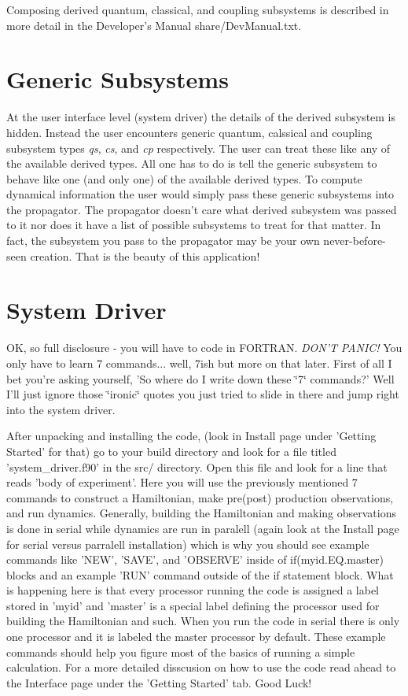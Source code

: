 Composing derived quantum, classical, and coupling subsystems is described in more detail in the Developer's Manual share/\+Dev\+Manual.\+txt.\hypertarget{_overview_Generic_Subsystems}{}\section{Generic Subsystems}\label{_overview_Generic_Subsystems}
At the user interface level (system driver) the details of the derived subsystem is hidden. Instead the user encounters generic quantum, calssical and coupling subsystem types {\itshape qs}, {\itshape cs}, and {\itshape cp} respectively. The user can treat these like any of the available derived types. All one has to do is tell the generic subsystem to behave like one (and only one) of the available derived types. To compute dynamical information the user would simply pass these generic subsystems into the propagator. The propagator doesn't care what derived subsystem was passed to it nor does it have a list of possible subsystems to treat for that matter. In fact, the subsystem you pass to the propagator may be your own never-\/before-\/seen creation. That is the beauty of this application!\hypertarget{_overview_System_Driver}{}\section{System Driver}\label{_overview_System_Driver}
O\+K, so full disclosure -\/ you will have to code in F\+O\+R\+T\+R\+A\+N. {\itshape D\+O\+N'T} {\itshape P\+A\+N\+I\+C!} You only have to learn 7 commands... well, 7ish but more on that later. First of all I bet you're asking yourself, 'So where do I write down these \char`\"{}7\char`\"{} commands?' Well I'll just ignore those \char`\"{}ironic\char`\"{} quotes you just tried to slide in there and jump right into the system driver.

After unpacking and installing the code, (look in Install page under 'Getting Started' for that) go to your build directory and look for a file titled 'system\+\_\+driver.\+f90' in the src/ directory. Open this file and look for a line that reads 'body of experiment'. Here you will use the previously mentioned 7 commands to construct a Hamiltonian, make pre(post) production observations, and run dynamics. Generally, building the Hamiltonian and making observations is done in serial while dynamics are run in paralell (again look at the Install page for serial versus parralell installation) which is why you should see example commands like 'N\+E\+W', 'S\+A\+V\+E', and 'O\+B\+S\+E\+R\+V\+E' inside of if(myid.\+E\+Q.\+master) blocks and an example 'R\+U\+N' command outside of the if statement block. What is happening here is that every processor running the code is assigned a label stored in 'myid' and 'master' is a special label defining the processor used for building the Hamiltonian and such. When you run the code in serial there is only one processor and it is labeled the master processor by default. These example commands should help you figure most of the basics of running a simple calculation. For a more detailed disscusion on how to use the code read ahead to the Interface page under the 'Getting Started' tab. Good Luck! 